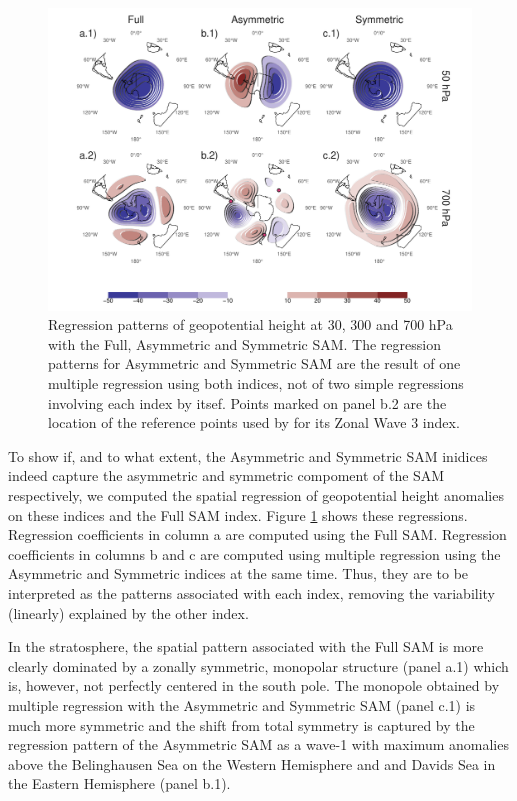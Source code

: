 \documentclass[]{ametsocV5}
\begin{document}
\begin{figure}
\includegraphics{2d-regr-1} \caption[Regression patterns of geopotential height at 30, 300 and 700 hPa with the Full, Asymmetric and Symmetric SAM]{Regression patterns of geopotential height at 30, 300 and 700 hPa with the Full, Asymmetric and Symmetric SAM. The regression patterns for Asymmetric and Symmetric SAM are the result of one multiple regression using both indices, not of two simple regressions involving each index by itsef. Points marked on panel b.2 are the location of the reference points used by \cite{raphael04} for its Zonal Wave 3 index.}\label{fig:2d-regr}
\end{figure}

To show if, and to what extent, the Asymmetric and Symmetric SAM
inidices indeed capture the asymmetric and symmetric compoment of the
SAM respectively, we computed the spatial regression of geopotential
height anomalies on these indices and the Full SAM index. Figure
\ref{fig:2d-regr} shows these regressions. Regression coefficients in
column a are computed using the Full SAM. Regression coefficients in
columns b and c are computed using multiple regression using the
Asymmetric and Symmetric indices at the same time. Thus, they are to be
interpreted as the patterns associated with each index, removing the
variability (linearly) explained by the other index.

In the stratosphere, the spatial pattern associated with the Full SAM is
more clearly dominated by a zonally symmetric, monopolar structure
(panel a.1) which is, however, not perfectly centered in the south pole.
The monopole obtained by multiple regression with the Asymmetric and
Symmetric SAM (panel c.1) is much more symmetric and the shift from
total symmetry is captured by the regression pattern of the Asymmetric
SAM as a wave-1 with maximum anomalies above the Belinghausen Sea on the
Western Hemisphere and and Davids Sea in the Eastern Hemisphere (panel
b.1).
\end{document}
